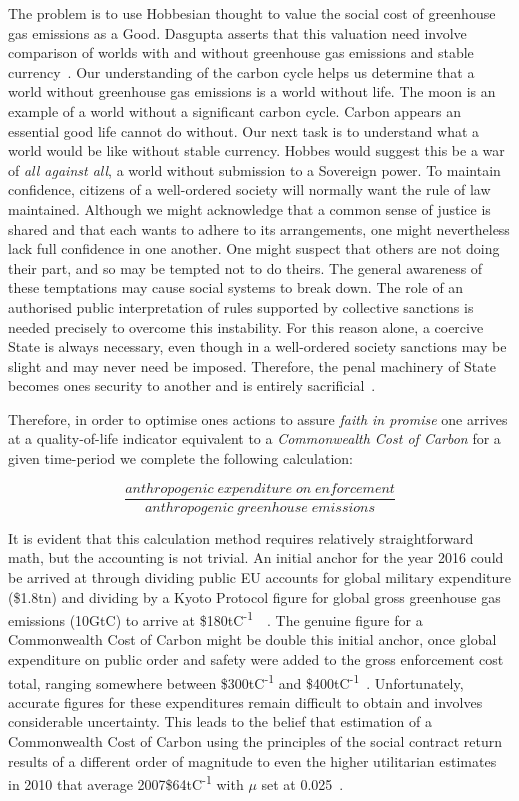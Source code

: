 \documentclass[11pt, oneside]{article}   	%
\begin{document}
The problem is to use Hobbesian thought to value the social cost of greenhouse gas emissions as a Good.
Dasgupta asserts that this valuation need involve comparison of worlds with and without greenhouse gas emissions and stable currency~\cite{pd2}.
Our understanding of the carbon cycle helps us determine that a world without greenhouse gas emissions is a world without life.
The moon is an example of a world without a significant carbon cycle.
Carbon appears an essential good life cannot do without.
Our next task is to understand what a world would be like without stable currency.
Hobbes would suggest this be a war of \emph{all against all}, a world without submission to a Sovereign power.
To maintain confidence, citizens of a well-ordered society will normally want the rule of law maintained.
Although we might acknowledge that a common sense of justice is shared and that each wants to adhere to its arrangements, one might nevertheless lack full confidence in one another.
One might suspect that others are not doing their part, and so may be tempted not to do theirs.
The general awareness of these temptations may cause social systems to break down.
The role of an authorised public interpretation of rules supported by collective sanctions is needed precisely to overcome this instability.
For this reason alone, a coercive State is always necessary, even though in a well-ordered society sanctions may be slight and may never need be imposed.
Therefore, the penal machinery of State becomes ones security to another and is entirely sacrificial~\cite{jr1}.\par

Therefore, in order to optimise ones actions to assure \emph{faith in promise} one arrives at a quality-of-life indicator equivalent to a \emph{Commonwealth Cost of Carbon} for a given time-period we complete the following calculation:

\begin{equation}
	\frac{anthropogenic\; expenditure\; on\; enforcement}{anthropogenic\; greenhouse\; emissions}
\end{equation}

It is evident that this calculation method requires relatively straightforward math, but the accounting is not trivial.
An initial anchor for the year 2016 could be arrived at through dividing public EU accounts for global military expenditure (\$1.8tn) and dividing by a Kyoto Protocol figure for global gross greenhouse gas emissions (10GtC) to arrive at \$180tC\textsuperscript{-1}~\cite{eu1}~\cite{co1}.
The genuine figure for a Commonwealth Cost of Carbon might be double this initial anchor, once global expenditure on public order and safety were added to the gross enforcement cost total, ranging somewhere between \$300tC\textsuperscript{-1} and \$400tC\textsuperscript{-1}~\cite{oecd1}.
Unfortunately, accurate figures for these expenditures remain difficult to obtain and involves considerable uncertainty.
This leads to the belief that estimation of a Commonwealth Cost of Carbon using the principles of the social contract return results of a different order of magnitude to even the higher utilitarian estimates in 2010 that average 2007\$64tC\textsuperscript{-1}  with $\mu$ set at 0.025~\cite{iwg1}.
\end{document}
